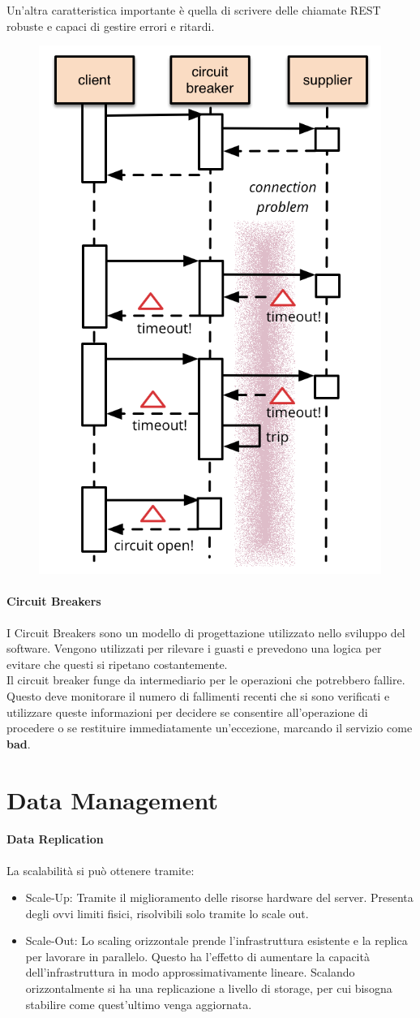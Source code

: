 \documentclass{article}
\begin{document}
		Un'altra caratteristica importante è quella di scrivere delle chiamate REST robuste e capaci di gestire errori e ritardi.\\
		
		\begin{figure}
			\centering
			\includegraphics[width=0.4\linewidth]{SAC_A3_breakers}
			\label{fig:saca3breakers}
		\end{figure}
		\paragraph{Circuit Breakers}
		
		I Circuit Breakers sono un modello di progettazione utilizzato nello sviluppo del software. Vengono utilizzati per rilevare i guasti e prevedono una logica per evitare che questi si ripetano costantemente.\\
		
		Il circuit breaker funge da intermediario per le operazioni che potrebbero fallire. Questo deve monitorare il numero di fallimenti recenti che si sono verificati e utilizzare queste informazioni per decidere se consentire all'operazione di procedere o se restituire immediatamente un'eccezione, marcando il servizio come \textbf{bad}.
		
		\newpage
		\section{Data Management}
		\paragraph{Data Replication}
		
		La scalabilità si può ottenere tramite:
		\begin{itemize}
			\item Scale-Up: Tramite il miglioramento delle risorse hardware del server. Presenta degli ovvi limiti fisici, risolvibili solo tramite lo scale out.
			\item Scale-Out: Lo scaling orizzontale prende l'infrastruttura esistente e la replica per lavorare in parallelo. Questo ha l'effetto di aumentare la capacità dell'infrastruttura in modo approssimativamente lineare. Scalando orizzontalmente si ha una replicazione a livello di storage, per cui bisogna stabilire come quest'ultimo venga aggiornata.
		\end{itemize}
		
\end{document}
